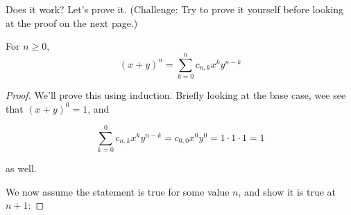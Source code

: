 Does it work? Let's prove it. (Challenge: Try to prove it yourself before looking at the proof on the next page.)

\newpage

\begin{theorem} 
\label{th:binom-expand}
For $n \geq 0$, 
\begin{equation}
(x+y)^n = \sum_{k=0}^n c_{n,k} x^k y^{n-k}
\end{equation} 

\end{theorem}
\begin{proof}
We'll prove this using induction. Briefly looking at the base case, wee see that $(x+y)^0 = 1$, and

\begin{equation*}
\sum_{k=0}^0 c_{n,k} x^k y^{n-k} = c_{0,0} x^0 y^0 = 1 \cdot 1 \cdot 1 = 1
\end{equation*}

as well.

We now assume the statement is true for some value $n$, and show it is true at $n+1$:


\end{proof}
